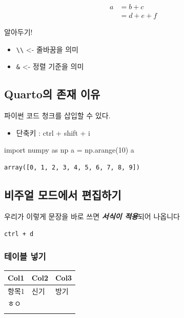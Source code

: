 \documentclass[
  letterpaper,
  DIV=11,
  numbers=noendperiod]{scrartcl}
\newenvironment{Shaded}{\begin{snugshade}}{\end{snugshade}}
\newcommand{\DecValTok}[1]{\textcolor[rgb]{0.68,0.00,0.00}{#1}}
\newcommand{\ImportTok}[1]{\textcolor[rgb]{0.00,0.46,0.62}{#1}}
\newcommand{\NormalTok}[1]{\textcolor[rgb]{0.00,0.23,0.31}{#1}}
\newcommand{\OperatorTok}[1]{\textcolor[rgb]{0.37,0.37,0.37}{#1}}
\providecommand{\tightlist}{%
  \setlength{\itemsep}{0pt}\setlength{\parskip}{0pt}}\usepackage{longtable,booktabs,array}
\begin{document}
\[
\begin{aligned}
a &= b + c \\
&= d + e + f
\end{aligned}
\]

알아두기!

\begin{itemize}
\tightlist
\item
  \texttt{\textbackslash{}\textbackslash{}} \textless- 줄바꿈을 의미
\item
  \texttt{\&} \textless- 정렬 기준을 의미
\end{itemize}

\subsection{Quarto의 존재
이유}\label{quartouxc758-uxc874uxc7ac-uxc774uxc720}

파이썬 코드 청크를 삽입할 수 있다.

\begin{itemize}
\tightlist
\item
  단축키 : ctrl + shift + i
\end{itemize}

\begin{Shaded}
\begin{Highlighting}[]
\ImportTok{import}\NormalTok{ numpy }\ImportTok{as}\NormalTok{ np}
\NormalTok{a }\OperatorTok{=}\NormalTok{ np.arange(}\DecValTok{10}\NormalTok{)}
\NormalTok{a}
\end{Highlighting}
\end{Shaded}

\begin{verbatim}
array([0, 1, 2, 3, 4, 5, 6, 7, 8, 9])
\end{verbatim}

\subsection{비주얼 모드에서
편집하기}\label{uxbe44uxc8fcuxc5bc-uxbaa8uxb4dcuxc5d0uxc11c-uxd3b8uxc9d1uxd558uxae30}

우리가 이렇게 문장을 바로 쓰면 \textbf{\emph{서식이 적용}}되어 나옵니다

\texttt{ctrl\ +\ d}

\subsubsection{테이블 넣기}\label{uxd14cuxc774uxbe14-uxb123uxae30}

\begin{longtable}[]{@{}lll@{}}
\toprule\noalign{}
Col1 & Col2 & Col3 \\
\midrule\noalign{}
\endhead
\bottomrule\noalign{}
\endlastfoot
항목1 & 신기 & 방기 \\
ㅎㅇ & & \\
& & \\
\end{longtable}
\end{document}
